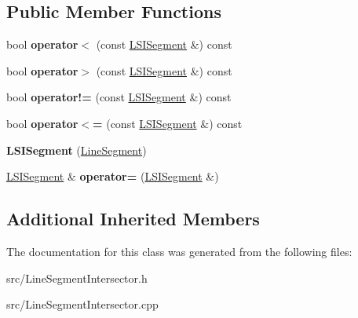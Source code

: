 \subsection*{Public Member Functions}
\begin{DoxyCompactItemize}
\item 
\mbox{\label{classLineSegmentIntersector_1_1LSISegment_a9849ef126f6018d8ebf789e7c216801d}} 
bool {\bfseries operator$<$} (const \hyperlink{classLineSegmentIntersector_1_1LSISegment}{L\+S\+I\+Segment} \&) const
\item 
\mbox{\label{classLineSegmentIntersector_1_1LSISegment_a46caed8fba72da47df4586d06197b33a}} 
bool {\bfseries operator$>$} (const \hyperlink{classLineSegmentIntersector_1_1LSISegment}{L\+S\+I\+Segment} \&) const
\item 
\mbox{\label{classLineSegmentIntersector_1_1LSISegment_a3771a4e4e29f239f5614909a86df824b}} 
bool {\bfseries operator!=} (const \hyperlink{classLineSegmentIntersector_1_1LSISegment}{L\+S\+I\+Segment} \&) const
\item 
\mbox{\label{classLineSegmentIntersector_1_1LSISegment_a001a3f2f7335f4f979b8d7f680ffbe9e}} 
bool {\bfseries operator$<$=} (const \hyperlink{classLineSegmentIntersector_1_1LSISegment}{L\+S\+I\+Segment} \&) const
\item 
\mbox{\label{classLineSegmentIntersector_1_1LSISegment_a4c6fd956e9c6b9c5cf6f27b9ffc89726}} 
{\bfseries L\+S\+I\+Segment} (\hyperlink{classLineSegment}{Line\+Segment})
\item 
\mbox{\label{classLineSegmentIntersector_1_1LSISegment_a9797f919e76bb5de2ccff9adc651ed91}} 
\hyperlink{classLineSegmentIntersector_1_1LSISegment}{L\+S\+I\+Segment} \& {\bfseries operator=} (\hyperlink{classLineSegmentIntersector_1_1LSISegment}{L\+S\+I\+Segment} \&)
\end{DoxyCompactItemize}
\subsection*{Additional Inherited Members}


The documentation for this class was generated from the following files\+:\begin{DoxyCompactItemize}
\item 
src/Line\+Segment\+Intersector.\+h\item 
src/Line\+Segment\+Intersector.\+cpp\end{DoxyCompactItemize}
